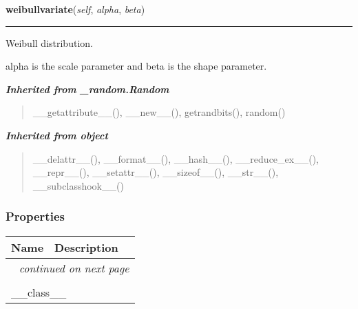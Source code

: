    \label{random:Random:weibullvariate}

    \vspace{0.5ex}

\hspace{.8\funcindent}\begin{boxedminipage}{\funcwidth}

    \raggedright \textbf{weibullvariate}(\textit{self}, \textit{alpha}, \textit{beta})

    \vspace{-1.5ex}

    \rule{\textwidth}{0.5\fboxrule}
\setlength{\parskip}{2ex}
    Weibull distribution.

    alpha is the scale parameter and beta is the shape parameter.

\setlength{\parskip}{1ex}
    \end{boxedminipage}


\large{\textbf{\textit{Inherited from \_random.Random}}}

\begin{quote}
\_\_getattribute\_\_(), \_\_new\_\_(), getrandbits(), random()
\end{quote}

\large{\textbf{\textit{Inherited from object}}}

\begin{quote}
\_\_delattr\_\_(), \_\_format\_\_(), \_\_hash\_\_(), \_\_reduce\_ex\_\_(), \_\_repr\_\_(), \_\_setattr\_\_(), \_\_sizeof\_\_(), \_\_str\_\_(), \_\_subclasshook\_\_()
\end{quote}


  \subsubsection{Properties}

    \vspace{-1cm}
\hspace{\varindent}\begin{longtable}{|p{\varnamewidth}|p{\vardescrwidth}|l}
\cline{1-2}
\cline{1-2} \centering \textbf{Name} & \centering \textbf{Description}& \\
\cline{1-2}
\endhead\cline{1-2}\multicolumn{3}{r}{\small\textit{continued on next page}}\\\endfoot\cline{1-2}
\endlastfoot\multicolumn{2}{|l|}{\textit{Inherited from object}}\\
\multicolumn{2}{|p{\varwidth}|}{\raggedright \_\_class\_\_}\\
\cline{1-2}
\end{longtable}


